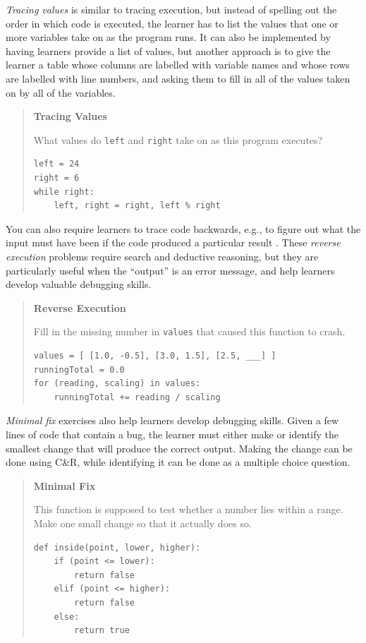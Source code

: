 \emph{Tracing values} is similar to tracing execution, but instead of
spelling out the order in which code is executed, the learner has to
list the values that one or more variables take on as the program runs.
It can also be implemented by having learners provide a list of values,
but another approach is to give the learner a table whose columns are
labelled with variable names and whose rows are labelled with line
numbers, and asking them to fill in all of the values taken on by all of
the variables.

\begin{quote}\setlength{\parindent}{0pt}
\textbf{Tracing Values}

What values do \texttt{left} and \texttt{right} take on as this program executes?

\begin{verbatim}
left = 24
right = 6
while right:
    left, right = right, left % right
\end{verbatim}
\end{quote}

You can also require learners to trace code backwards, e.g., to figure
out what the input must have been if the code produced a particular
result \cite{Armo2008}. These \emph{reverse execution} problems require
search and deductive reasoning, but they are particularly useful when
the ``output'' is an error message, and help learners develop valuable
debugging skills.

\begin{quote}\setlength{\parindent}{0pt}
\textbf{Reverse Execution}

Fill in the missing number in \texttt{values} that caused this function to
crash.

\begin{verbatim}
values = [ [1.0, -0.5], [3.0, 1.5], [2.5, ___] ]
runningTotal = 0.0
for (reading, scaling) in values:
    runningTotal += reading / scaling
\end{verbatim}
\end{quote}

\emph{Minimal fix} exercises also help learners develop debugging skills.
Given a few lines of code that contain a bug, the learner must either
make or identify the smallest change that will produce the correct
output. Making the change can be done using C\&R, while identifying it
can be done as a multiple choice question.

\begin{quote}\setlength{\parindent}{0pt}
\textbf{Minimal Fix}

This function is supposed to test whether a number lies within a
range. Make one small change so that it actually does so.

\begin{verbatim}
def inside(point, lower, higher):
    if (point <= lower):
        return false
    elif (point <= higher):
        return false
    else:
        return true
\end{verbatim}
\end{quote}

